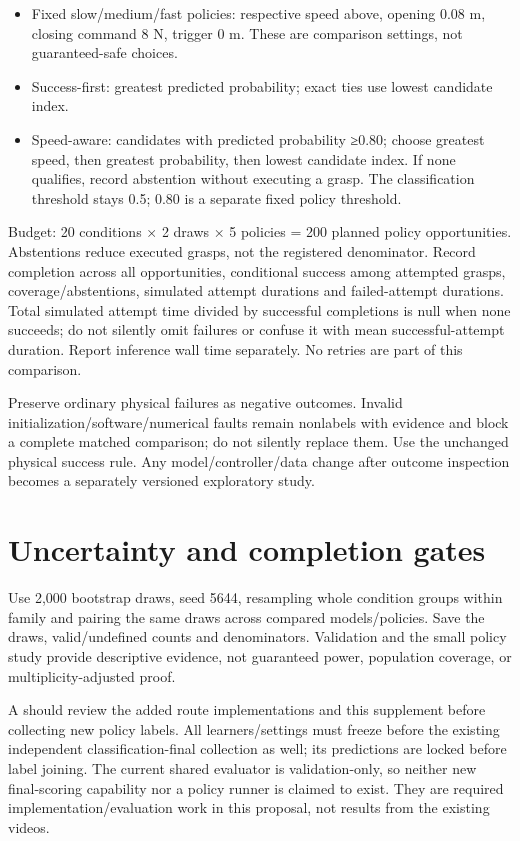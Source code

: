 \documentclass[11pt,letterpaper]{article}
\begin{document}
\begin{itemize}\item Fixed slow/medium/fast policies: respective speed above, opening 0.08 m, closing command 8 N, trigger 0 m. These are comparison settings, not guaranteed-safe choices.\end{itemize}

\begin{itemize}\item Success-first: greatest predicted probability; exact ties use lowest candidate index.\end{itemize}

\begin{itemize}\item Speed-aware: candidates with predicted probability ≥0.80; choose greatest speed, then greatest probability, then lowest candidate index. If none qualifies, record abstention without executing a grasp. The classification threshold stays 0.5; 0.80 is a separate fixed policy threshold.\end{itemize}

Budget: 20 conditions × 2 draws × 5 policies = 200 planned policy opportunities. Abstentions reduce executed grasps, not the registered denominator. Record completion across all opportunities, conditional success among attempted grasps, coverage/abstentions, simulated attempt durations and failed-attempt durations. Total simulated attempt time divided by successful completions is null when none succeeds; do not silently omit failures or confuse it with mean successful-attempt duration. Report inference wall time separately. No retries are part of this comparison.

Preserve ordinary physical failures as negative outcomes. Invalid initialization/software/numerical faults remain nonlabels with evidence and block a complete matched comparison; do not silently replace them. Use the unchanged physical success rule. Any model/controller/data change after outcome inspection becomes a separately versioned exploratory study.

\section*{Uncertainty and completion gates}

Use 2,000 bootstrap draws, seed 5644, resampling whole condition groups within family and pairing the same draws across compared models/policies. Save the draws, valid/undefined counts and denominators. Validation and the small policy study provide descriptive evidence, not guaranteed power, population coverage, or multiplicity-adjusted proof.

A should review the added route implementations and this supplement before collecting new policy labels. All learners/settings must freeze before the existing independent classification-final collection as well; its predictions are locked before label joining. The current shared evaluator is validation-only, so neither new final-scoring capability nor a policy runner is claimed to exist. They are required implementation/evaluation work in this proposal, not results from the existing videos.
\end{document}
